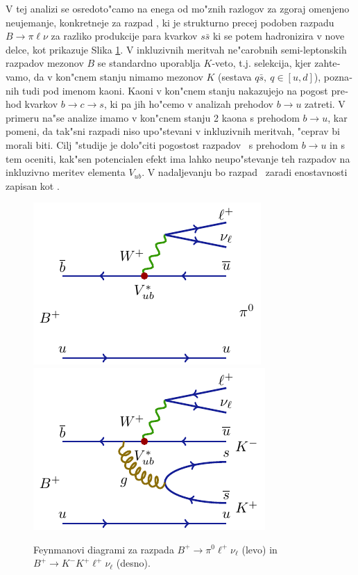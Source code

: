 \begin{otherlanguage}{slovene}
V tej analizi se osredoto"camo na enega od mo"znih razlogov za zgoraj omenjeno neujemanje, konkretneje za razpad \decayb, ki je strukturno precej podoben razpadu $B \to \pi \ell \nu$ za razliko produkcije para kvarkov $s \bar s$ ki se potem hadronizira v nove delce, kot prikazuje Slika \ref{feynman}. V inkluzivnih meritvah ne"carobnih semi-leptonskih razpadov mezonov $B$ se standardno uporablja $K$-veto, t.j. selekcija, kjer zahtevamo, da v kon"cnem stanju nimamo mezonov $K$ (sestava $q \bar s,~q \in [u,d]$), poznanih tudi pod imenom kaoni. Kaoni v kon"cnem stanju nakazujejo na pogost prehod kvarkov $b \to c \to s$, ki pa jih ho"cemo v analizah prehodov $b \to u$ zatreti. V primeru na"se analize imamo v kon"cnem stanju 2 kaona s prehodom $b \to u$, kar pomeni, da tak"sni razpadi niso upo"stevani v inkluzivnih meritvah, "ceprav bi morali biti. Cilj "studije je dolo"citi pogostost razpadov \decayb~s prehodom $b\to u$ in s tem oceniti, kak"sen potencialen efekt ima lahko neupo"stevanje teh razpadov na inkluzivno meritev elementa $V_{ub}$. V nadaljevanju bo razpad \decayb~zaradi enostavnosti zapisan kot \decaya.
\begin{figure}[H]
\centering
\includegraphics{texfig/B2pilnu}
\hspace{1cm}
\includegraphics{texfig/B2KKlnu}
\caption{Feynmanovi diagrami za razpada $B^+ \to \pi^0 \ell^+ \nu_\ell$ (levo) in $B^+ \to K^- K^+ \ell^+ \nu_\ell$ (desno).}
\label{feynman}
\end{figure}


\end{otherlanguage}
